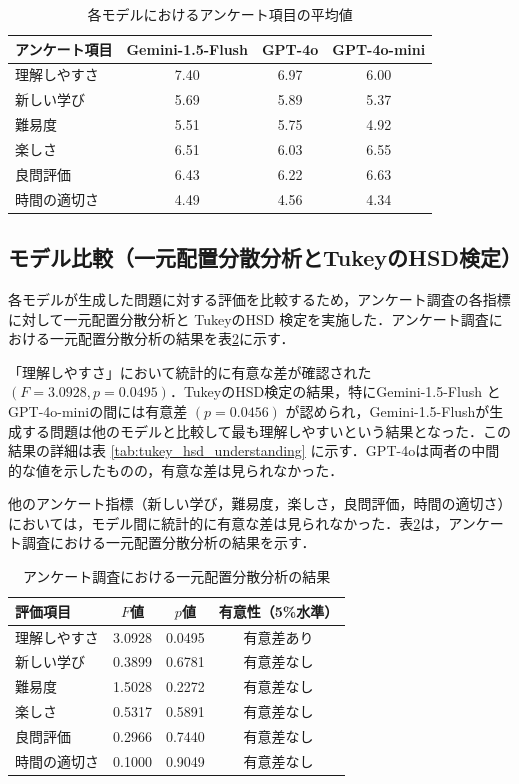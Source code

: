 \documentclass[11pt]{jreport}
\begin{document}
\begin{table}[htbp]
  \centering
  \caption{各モデルにおけるアンケート項目の平均値}
  \label{tab:mean_values}
  \begin{tabular}{lccc}
    \toprule
    アンケート項目 & Gemini-1.5-Flush & GPT-4o & GPT-4o-mini \\
    \midrule
    理解しやすさ & 7.40 & 6.97 & 6.00 \\
    新しい学び & 5.69 & 5.89 & 5.37 \\
    難易度 & 5.51 & 5.75 & 4.92 \\
    楽しさ & 6.51 & 6.03 & 6.55 \\
    良問評価 & 6.43 & 6.22 & 6.63 \\
    時間の適切さ & 4.49 & 4.56 & 4.34 \\
    \bottomrule
  \end{tabular}
\end{table}

\newpage
\subsection{モデル比較（一元配置分散分析とTukeyのHSD検定）}

各モデルが生成した問題に対する評価を比較するため，アンケート調査の各指標に対して一元配置分散分析と TukeyのHSD 検定を実施した．アンケート調査における一元配置分散分析の結果を表\ref{tab:anova_results}に示す．


「理解しやすさ」において統計的に有意な差が確認された $(F=3.0928, p=0.0495)$．TukeyのHSD検定の結果，特にGemini-1.5-Flush とGPT-4o-miniの間には有意差 $(p=0.0456)$ が認められ，Gemini-1.5-Flushが生成する問題は他のモデルと比較して最も理解しやすいという結果となった．この結果の詳細は表 \ref{tab:tukey_hsd_understanding} に示す．GPT-4oは両者の中間的な値を示したものの，有意な差は見られなかった．

他のアンケート指標（新しい学び，難易度，楽しさ，良問評価，時間の適切さ）においては，モデル間に統計的に有意な差は見られなかった．表\ref{tab:anova_results}は，アンケート調査における一元配置分散分析の結果を示す．

\begin{table}[h]
  \centering
  \caption{アンケート調査における一元配置分散分析の結果}
  \label{tab:anova_results}
  \begin{tabular}{lccc}
    \hline
    評価項目 & $F$値 & $p$値 & 有意性（5\%水準） \\
    \hline
    理解しやすさ & 3.0928 & 0.0495 & 有意差あり \\
    新しい学び & 0.3899 & 0.6781 & 有意差なし \\
    難易度 & 1.5028 & 0.2272 & 有意差なし \\
    楽しさ & 0.5317 & 0.5891 & 有意差なし \\
    良問評価 & 0.2966 & 0.7440 & 有意差なし \\
    時間の適切さ & 0.1000 & 0.9049 & 有意差なし \\
    \hline
  \end{tabular}
\end{table}
\end{document}
